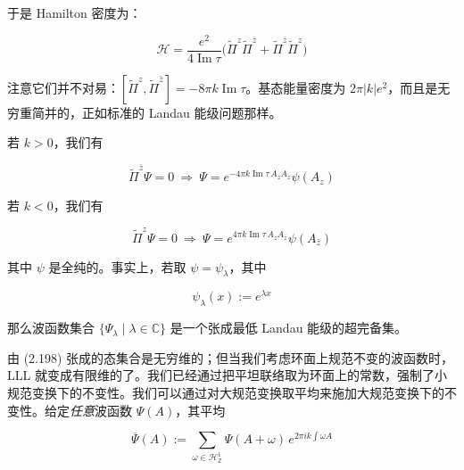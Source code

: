于是 Hamilton 密度为：

\begin{equation}
  \mathcal{H}=\frac{e^2}{4\operatorname{Im}\tau}
  \big(\tilde\Pi^{z}\tilde\Pi^{\bar z}+\tilde\Pi^{\bar z}\tilde\Pi^{z}\big)
  \tag{2.195}
  \label{eq:2.195}
\end{equation}

注意它们并不对易：$[\tilde\Pi^{z},\tilde\Pi^{\bar z}]=-8\pi k\operatorname{Im}\tau$。基态能量密度为 $2\pi|k|e^2$，而且是无穷重简并的，正如标准的 Landau 能级问题那样。

若 $k>0$，我们有

\begin{equation}
  \tilde\Pi^{\bar z}\Psi=0\ \Rightarrow\ \Psi=e^{-4\pi k\operatorname{Im}\tau\,A_zA_{\bar z}}\psi(A_z)
  \tag{2.196}
  \label{eq:2.196}
\end{equation}

若 $k<0$，我们有

\begin{equation}
  \tilde\Pi^{z}\Psi=0\ \Rightarrow\ \Psi=e^{4\pi k\operatorname{Im}\tau\,A_zA_{\bar z}}\psi(A_{\bar z})
  \tag{2.197}
  \label{eq:2.197}
\end{equation}

其中 $\psi$ 是全纯的。事实上，若取 $\psi=\psi_\lambda$，其中

\begin{equation}
  \psi_\lambda(x):=e^{\lambda x}
  \tag{2.198}
  \label{eq:2.198}
\end{equation}

那么波函数集合 $\{\Psi_\lambda\mid\lambda\in\mathbb{C}\}$ 是一个张成最低 Landau 能级的超完备集。

由 (2.198) 张成的态集合是无穷维的；但当我们考虑环面上规范不变的波函数时，LLL 就变成有限维的了。我们已经通过把平坦联络取为环面上的常数，强制了小规范变换下的不变性。我们可以通过对大规范变换取平均来施加大规范变换下的不变性。给定\emph{任意}波函数 $\Psi(A)$，其平均

\begin{equation}
  \overline{\Psi}(A):=\sum_{\omega\in\mathcal{H}^1_{\mathbb{Z}}}\Psi(A+\omega)\,e^{2\pi ik\int\omega A}
  \tag{2.199}
  \label{eq:2.199}
\end{equation}

